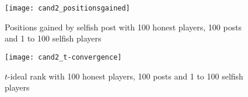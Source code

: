       \begin{figure}[!htbp]
        \texttt{[image: cand2\_positionsgained]}
        \caption{Positions gained by selfish post with 100 honest players, 100
        posts and 1 to 100 selfish players}
      \end{figure}

      \begin{figure}[!htbp]
        \texttt{[image: cand2\_t-convergence]}
        \caption{$t$-ideal rank with 100 honest players, 100 posts and 1 to 100
        selfish players}
      \end{figure}
